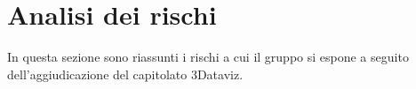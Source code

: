 \section{Analisi dei rischi}
In questa sezione sono riassunti i rischi a cui il gruppo si espone a seguito dell'aggiudicazione del capitolato 3Dataviz.